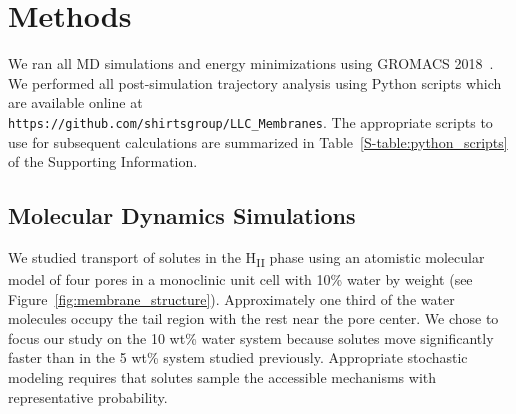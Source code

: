 \documentclass{article}
\begin{document}
  

  \section{Methods}
    
  We ran all MD simulations and energy minimizations using GROMACS 2018~\cite{bekker_gromacs:_1993,berendsen_gromacs:_1995,van_der_spoel_gromacs:_2005,hess_gromacs_2008}.  %
  We performed all post-simulation trajectory analysis using Python scripts which 
  are available online at \\ \texttt{https://github.com/shirtsgroup/LLC\_Membranes}.
  The appropriate scripts to use for subsequent calculations are summarized in 
  Table~\ref{S-table:python_scripts} of the Supporting Information.
  
  \subsection{Molecular Dynamics Simulations}

  We studied transport of solutes in the H\textsubscript{II} phase using an atomistic
  molecular model of four pores in a monoclinic unit cell with 10\% water by weight 
  (see Figure~\ref{fig:membrane_structure}). Approximately one third of the water 
  molecules occupy the tail region with the rest near the pore center. We chose to
  focus our study on the 10 wt\% water system because solutes move significantly 
  faster than in the 5 wt\% system studied previously. Appropriate stochastic 
  modeling requires that solutes sample the accessible mechanisms with representative
  probability.
  
\end{document}
